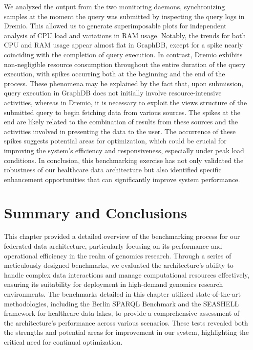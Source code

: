 We analyzed the output from the two monitoring daemons, synchronizing samples at the moment the query was submitted by inspecting the query logs in Dremio. This allowed us to generate superimposable plots for independent analysis of \ac{CPU} load and variations in \ac{RAM} usage.
Notably, the trends for both \ac{CPU} and \ac{RAM} usage appear almost flat in GraphDB, except for a spike nearly coinciding with the completion of query execution. In contrast, Dremio exhibits non-negligible resource consumption throughout the entire duration of the query execution, with spikes occurring both at the beginning and the end of the process.
These phenomena may be explained by the fact that, upon submission, query execution in GraphDB does not initially involve resource-intensive activities, whereas in Dremio, it is necessary to exploit the views structure of the submitted query to begin fetching data from various sources. The spikes at the end are likely related to the combination of results from these sources and the activities involved in presenting the data to the user.
The occurrence of these spikes suggests potential areas for optimization, which could be crucial for improving the system's efficiency and responsiveness, especially under peak load conditions.
In conclusion, this benchmarking exercise has not only validated the robustness of our healthcare data architecture but also identified specific enhancement opportunities that can significantly improve system performance.


\section{Summary and Conclusions}
This chapter provided a detailed overview of the benchmarking process for our federated data architecture, particularly focusing on its performance and operational efficiency in the realm of genomics research. Through a series of meticulously designed benchmarks, we evaluated the architecture's ability to handle complex data interactions and manage computational resources effectively, ensuring its suitability for deployment in high-demand genomics research environments.
The benchmarks detailed in this chapter utilized state-of-the-art methodologies, including the Berlin \ac{SPARQL} Benchmark and the \ac{SEASHELL} framework for healthcare data lakes, to provide a comprehensive assessment of the architecture's performance across various scenarios. These tests revealed both the strengths and potential areas for improvement in our system, highlighting the critical need for continual optimization.